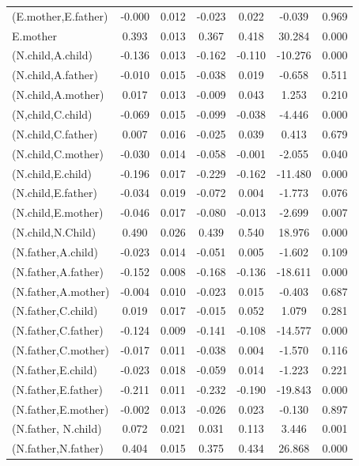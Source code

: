 \documentclass[11pt,a5paper,twoside]{book}
\begin{document}
{{\begin{center}
\begin{longtable}{@{\extracolsep{\fill}}lcccccc@{}}
   (E.mother,E.father)  & -0.000 & 0.012 & -0.023 & 0.022 & -0.039 & 0.969 \\ 
   E.mother  & 0.393 & 0.013 & 0.367 & 0.418 & 30.284 & 0.000 \\ 
   (N.child,A.child)  & -0.136 & 0.013 & -0.162 & -0.110 & -10.276 & 0.000 \\ 
   (N.child,A.father)  & -0.010 & 0.015 & -0.038 & 0.019 & -0.658 & 0.511 \\ 
   (N.child,A.mother)  & 0.017 & 0.013 & -0.009 & 0.043 & 1.253 & 0.210 \\ 
  (N,child,C.child)  & -0.069 & 0.015 & -0.099 & -0.038 & -4.446 & 0.000 \\ 
   (N.child,C.father)  & 0.007 & 0.016 & -0.025 & 0.039 & 0.413 & 0.679 \\ 
   (N.child,C.mother)  & -0.030 & 0.014 & -0.058 & -0.001 & -2.055 & 0.040 \\ 
   (N.child,E.child)  & -0.196 & 0.017 & -0.229 & -0.162 & -11.480 & 0.000 \\ 
   (N.child,E.father)  & -0.034 & 0.019 & -0.072 & 0.004 & -1.773 & 0.076 \\ 
   (N.child,E.mother)  & -0.046 & 0.017 & -0.080 & -0.013 & -2.699 & 0.007 \\ 
   (N.child,N.Child)  & 0.490 & 0.026 & 0.439 & 0.540 & 18.976 & 0.000 \\ 
   (N.father,A.child)  & -0.023 & 0.014 & -0.051 & 0.005 & -1.602 & 0.109 \\ 
   (N.father,A.father)  & -0.152 & 0.008 & -0.168 & -0.136 & -18.611 & 0.000 \\ 
   (N.father,A.mother)  & -0.004 & 0.010 & -0.023 & 0.015 & -0.403 & 0.687 \\ 
   (N.father,C.child)  & 0.019 & 0.017 & -0.015 & 0.052 & 1.079 & 0.281 \\ 
   (N.father,C.father)  & -0.124 & 0.009 & -0.141 & -0.108 & -14.577 & 0.000 \\ 
   (N.father,C.mother)  & -0.017 & 0.011 & -0.038 & 0.004 & -1.570 & 0.116 \\ 
   (N.father,E.child)  & -0.023 & 0.018 & -0.059 & 0.014 & -1.223 & 0.221 \\ 
   (N.father,E.father)  & -0.211 & 0.011 & -0.232 & -0.190 & -19.843 & 0.000 \\ 
   (N.father,E.mother)  & -0.002 & 0.013 & -0.026 & 0.023 & -0.130 & 0.897 \\ 
   (N.father, N.child)  & 0.072 & 0.021 & 0.031 & 0.113 & 3.446 & 0.001 \\ 
   (N.father,N.father)  & 0.404 & 0.015 & 0.375 & 0.434 & 26.868 & 0.000 \\ 

\end{longtable}
\end{center}}}
\end{document}
